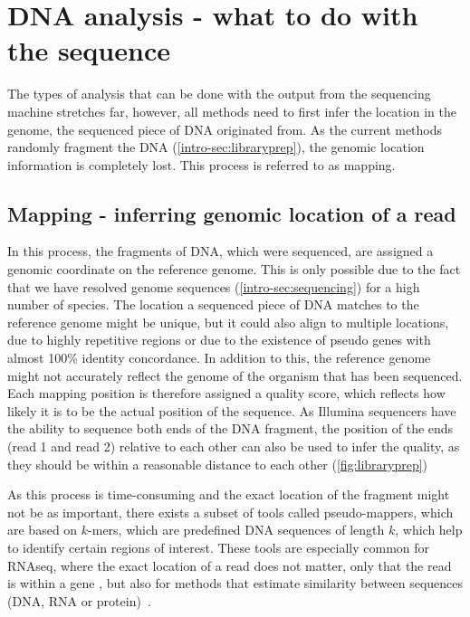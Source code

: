 \section[DNA analysis]{DNA analysis - what to do with the sequence}
\label{intro-sec:analysis}
The types of analysis that can be done with the output from the sequencing machine stretches far,  however, all methods need to first infer the location in the genome, the sequenced piece of DNA originated from. As the current methods randomly fragment the DNA (\autoref{intro-sec:libraryprep}), the genomic location information is completely lost. This process is referred to as mapping.

\subsection[Mapping]{Mapping - inferring genomic location of a read}
\label{intro-sec:mapping}
In this process, the fragments of DNA, which were sequenced, are assigned a genomic coordinate on the reference genome. This is only possible due to the fact that we have resolved genome sequences (\autoref{intro-sec:sequencing}) for a high number of species. The location a sequenced piece of DNA matches to the reference genome might be unique, but it could also align to multiple locations, due to highly repetitive regions or due to the existence of pseudo genes with almost 100\% identity concordance. In addition to this, the reference genome might not accurately reflect the genome of the organism that has been sequenced. Each mapping position is therefore assigned a quality score, which reflects how likely it is to be the actual position of the sequence. As Illumina sequencers have the ability to sequence both ends of the DNA fragment, the position of the ends (read 1 and read 2) relative to each other can also be used to infer the quality, as they should be within a reasonable distance to each other (\autoref{fig:libraryprep})

As this process is time-consuming and the exact location of the fragment might not be as important, there exists a subset of tools called pseudo-mappers, which are based on $k$-mers, which are predefined DNA sequences of length $k$, which help to identify certain regions of interest. These tools are especially common for RNAseq, where the exact location of a read does not matter, only that the read is within a gene \cite{Bray2016,Patro2017}, but also for methods that estimate similarity between sequences (DNA, RNA or protein)~\cite{Ondov2016,Luczak2017}.

